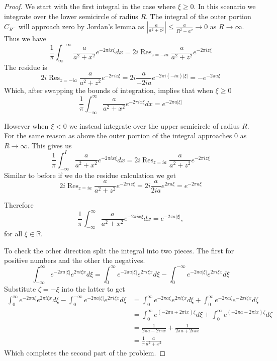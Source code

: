 \documentclass[10pt]{article}
\newcommand{\bb}[1]{\mathbb{#1}}
\DeclareMathOperator{\res}{Res}
\theoremstyle{plain}
\theoremstyle{remark}
\begin{document}
\begin{proof}
  We start with the first integral in the case where $\xi\geq 0$. In this scenario
  we integrate over the lower semicircle of radius $R$. The integral of the
  outer portion $C_{R^-}$ will approach zero by Jordan's lemma as
  $|\frac{a}{a^2+z^2}|\leq\frac{a}{R^2-a^2}\rightarrow 0 $ as $R\rightarrow\infty$. Thus we have
  \[
    \frac{1}{\pi}\int_\infty^{-\infty}\frac{a}{a^2 + x^2}e^{-2\pi ix\xi}dx = 2 i \res_{z=-ia}\frac{a}{a^2 + z^2}e^{-2\pi iz\xi}
  \]
  The residue is
  \[
    2i\res_{z=-ia}\frac{a}{a^2 + z^2}e^{-2\pi iz\xi}=2i\frac{a}{-2ia}e^{-2\pi i(-ia)|\xi|} = -e^{-2\pi a\xi}
  \]
  Which, after swapping the bounds of integration, implies that when $\xi\geq 0$
  \[
    \frac{1}{\pi} \int_{-\infty}^\infty \frac{a}{a^2 + x^2}e^{-2\pi ix\xi}dx = e^{-2\pi a |\xi|}
  \]

  However when $\xi<0$ we instead integrate over the upper semicircle of radius $R$. For the
  same reason as above the outer portion of the integral approaches 0 as $R\rightarrow\infty$. This gives
  us
  \[
    \frac{1}{\pi}\int_{-\infty}^I\frac{a}{a^2 + x^2}e^{-2\pi ix\xi} dx = 2 i \res_{z=ia}\frac{a}{a^2 + z^2}e^{-2\pi iz\xi}
  \]
  Similar to before if we do the residue calculation we get
  \[
    2 i \res_{z=ia}\frac{a}{a^2 + z^2}e^{-2\pi iz\xi}= 2 i \frac{a}{2ia}e^{2\pi a\xi}=e^{-2\pi a\xi}
  \]

  Therefore
  \[
    \frac{1}{\pi} \int_{-\infty}^\infty \frac{a}{a^2 + x^2}e^{-2\pi ix\xi}dx = e^{-2\pi a |\xi|},
  \]
  for all $\xi\in \bb{R}$.

  To check the other direction split the integral into two pieces. The first
  for positive numbers and the other the negatives.
  \[
    \int_{-\infty}^\infty e^{-2\pi a|\xi|}e^{2\pi i\xi x}d\xi = \int_0^\infty e^{-2\pi a|\xi|}e^{2\pi i\xi x}d\xi-\int_{0}^{-\infty} e^{-2\pi a|\xi|}e^{2\pi i\xi x}d\xi
  \]
  Substitute $\zeta=-\xi$ into the latter to get
  \begin{align*}
    \int_0^\infty e^{-2\pi a\xi}e^{2\pi i\xi x}d\xi-\int_{0}^{-\infty} e^{-2\pi a|\xi|}e^{2\pi i\xi x}d\xi &= \int_0^\infty e^{-2\pi a\xi}e^{2\pi i\xi x}d\xi+\int_{0}^{\infty} e^{-2\pi a\zeta}e^{-2\pi i\zeta x}d\zeta\\
                                                                                      &= \int_0^\infty e^{(-2\pi a+2\pi i x)\xi}d\xi+\int_{0}^{\infty} e^{(-2\pi a-2\pi ix)\zeta}d\zeta\\
                                                                                      &=\frac{1}{2\pi a-2i\pi x}+\frac{1}{2\pi a+2i\pi x}\\
                                                                                      &=\frac{1}{\pi}\frac{a}{a^2+x^2}
  \end{align*}
  Which completes the second part of the problem.
\end{proof}
\end{document}
